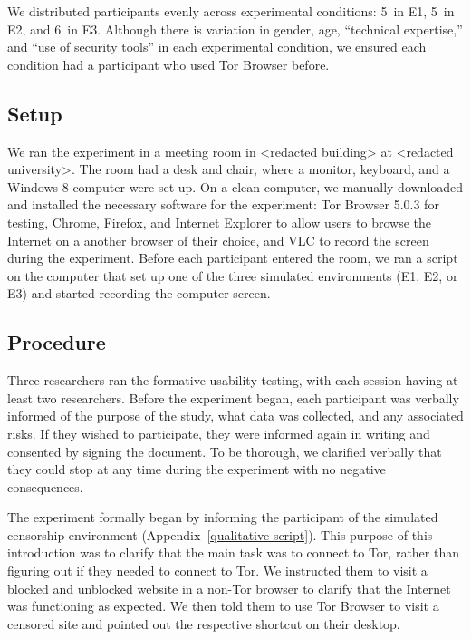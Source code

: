 \documentclass[USenglish,oneside,twocolumn]{article}
\begin{document}


We distributed participants evenly across experimental conditions:  5~in E1, 5~in E2, and 6~in E3. Although there is variation in gender, age, ``technical expertise,'' and ``use of security tools'' in each experimental condition, we ensured each condition had a participant who used Tor Browser before. 

\subsection{Setup} 
We ran the experiment in a meeting room in <redacted building> at <redacted university>. The room had a desk and chair, where a monitor, keyboard, and a Windows 8 computer were set up. On a clean computer, we manually downloaded and installed the necessary software for the experiment: Tor Browser 5.0.3 for testing, Chrome, Firefox, and Internet Explorer to allow users to browse the Internet on a another browser of their choice, and VLC to record the screen during the experiment. Before each participant entered the room, we ran a script on the computer that
set up one of the three simulated environments (E1, E2, or E3) and started recording the computer screen.  

\subsection{Procedure}
Three researchers ran the formative usability testing, with each session having at least two researchers.  
Before the experiment began, each participant was verbally informed of the purpose of the 
study, what data was collected, and any associated risks. If they wished to participate,
they were informed again in writing and consented by signing the document. To be thorough, 
we clarified verbally that they could stop at any time during the experiment with no negative consequences. 

The experiment formally began by informing the participant of the simulated censorship environment (Appendix~\ref{qualitative-script}). This purpose of this introduction was to clarify that the main task
was to connect to Tor, rather than figuring out if they needed to connect to Tor. 
We instructed them to visit a blocked and unblocked website
in a non-Tor browser to clarify that the Internet was functioning as expected. 
We then told them to use Tor Browser to visit a censored site and pointed out 
the respective shortcut on their desktop.
\end{document}
